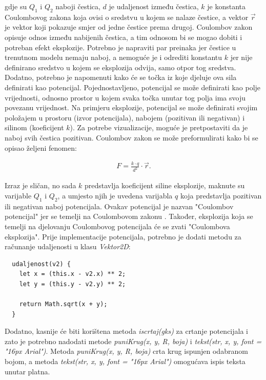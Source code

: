 \documentclass{foi}
\begin{document}
gdje su $Q_1$ i $Q_2$ naboji čestica, $d$ je udaljenost između čestica, $k$ je konstanta Coulombovog zakona koja ovisi o sredstvu u kojem se nalaze čestice, a vektor $\Vec{r}$ je vektor koji pokazuje smjer od jedne čestice prema drugoj. Coulombov zakon opisuje odnos između nabijenih čestica, a tim odnosom bi se mogao dobiti i potreban efekt eksplozije. Potrebno je napraviti par preinaka jer čestice u trenutnom modelu nemaju naboj, a nemoguće je i odrediti konstantu $k$ jer nije definirano sredstvo u kojem se eksplozija odvija, samo otpor tog sredstva. Dodatno, potrebno je napomenuti kako će se točka iz koje djeluje ova sila definirati kao potencijal. Pojednostavljeno, potencijal se može definirati kao polje vrijednosti, odnosno prostor u kojem svaka točka unutar tog polja ima svoju povezanu vrijednost. Na primjeru eksplozije, potencijal se može definirati svojim položajem u prostoru (izvor potencijala), nabojem (pozitivan ili negativan) i silinom (koeficijent $k$). Za potrebe vizualizacije, moguće je pretpostaviti da je naboj svih čestica pozitivan. Coulombov zakon se može preformulirati kako bi se opisao željeni fenomen:

 \begin{align*}
F = \frac{k\cdot q}{d^2}\cdot \Vec{r}.
\end{align*}

Izraz je sličan, no sada $k$ predstavlja koeficijent siline eksplozije, maknute su varijable $Q_1$ i $Q_2$, a umjesto njih je uvedena varijabla $q$ koja predstavlja pozitivan ili negativan naboj potencijala. Ovakav potencijal je nazvan "Coulombov potencijal" jer se temelji na Coulombovom zakonu \parencite{ByjusCoulombsLaw}. Također, eksplozija koja se temelji na djelovanju Coulombovog potencijala će se zvati "Coulombova eksplozija". Prije implementacije potencijala, potrebno je dodati metodu za računanje udaljenosti u klasu \textit{Vektor2D}:

\begin{verbatim}
  udaljenost(v2) {
    let x = (this.x - v2.x) ** 2;
    let y = (this.y - v2.y) ** 2;

    return Math.sqrt(x + y);
  }
\end{verbatim}

Dodatno, kasnije će biti korištena metoda \textit{iscrtaj(gks)} za crtanje potencijala i zato je potrebno nadodati metode \textit{puniKrug(x, y, R, boja)} i \textit{tekst(str, x, y, font = "16px Arial")}. Metoda \textit{puniKrug(x, y, R, boja)} crta krug ispunjen odabranom bojom, a metoda \textit{tekst(str, x, y, font = "16px Arial")} omogućava ispis teksta unutar platna.
\end{document}
